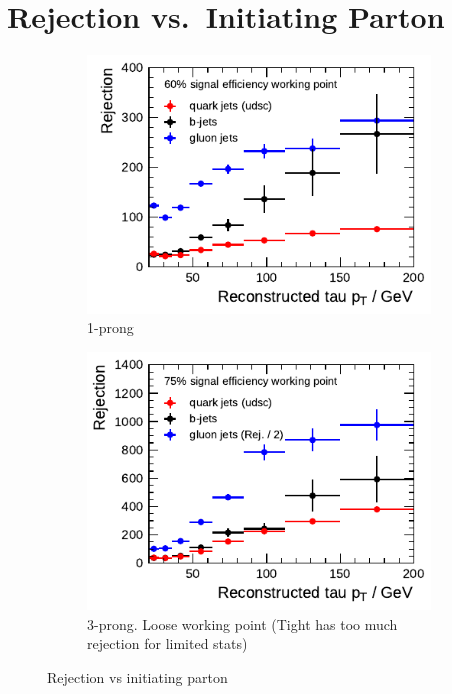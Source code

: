 \section{Rejection vs.\ Initiating Parton}
\label{app:bdt_parton}
\begin{figure}[htb]
  \centering
  \begin{subfigure}[t]{0.48\textwidth}
    \centering
    \includegraphics{./figures/bdt_perf/parton/truth_parton_1p.pdf}
    \caption{1-prong}
  \end{subfigure}\hfill
  \begin{subfigure}[t]{0.48\textwidth}
    \centering
    \includegraphics{./figures/bdt_perf/parton/truth_parton_3p.pdf}
    \caption{3-prong. Loose working point (Tight has too much rejection for
      limited stats)}
  \end{subfigure}
  \caption{Rejection vs initiating parton}
\end{figure}

